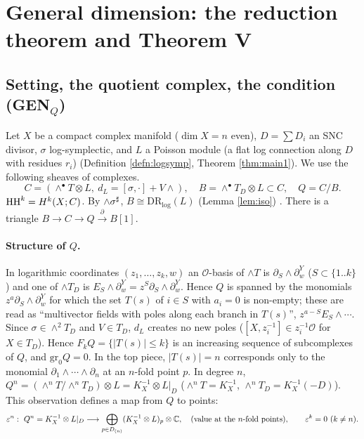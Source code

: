 \section{General dimension: the reduction theorem and Theorem V}\label{sec:reduction}
\subsection{Setting, the quotient complex, the condition (GEN$_Q$)}
Let $X$ be a compact complex manifold ($\dim X=n$ even), $D=\sum D_i$ an SNC divisor, $\sigma$ log-symplectic, and $L$ a Poisson module (a flat log connection along $D$ with residues $r_i$) (Definition \ref{defn:logsymp}, Theorem \ref{thm:main1}). We use the following sheaves of complexes.
\[C=(\wedge^\bullet T\otimes L,\ d_L=[\sigma,\cdot]+V\wedge),\quad B=\wedge^\bullet T_D\otimes L\subset C,\quad Q=C/B.\]
$\mathrm{HH}^k=H^k(X;C)$. By $\wedge\sigma^\sharp$, $B\cong\mathrm{DR}_{\log}(L)$ (Lemma \ref{lem:iso}) \tC. There is a triangle $B\to C\to Q\xrightarrow{\ \partial\ }B[1]$.

\paragraph{Structure of $Q$.} In logarithmic coordinates $(z_1,\dots,z_k,w)$ an $\mathcal O$-basis of $\wedge T$ is $\partial_S\wedge\partial_w^{Y}$ ($S\subset\{1..k\}$) and one of $\wedge T_D$ is $E_S\wedge\partial_w^Y=z^S\partial_S\wedge\partial_w^Y$. Hence $Q$ is spanned by the monomials $z^a\partial_S\wedge\partial_w^Y$ for which the set $T(s)$ of $i\in S$ with $a_i=0$ is non-empty; these are read as ``multivector fields with poles along each branch in $T(s)$'', $z^{a-S}E_S\wedge\cdots$. Since $\sigma\in\wedge^2T_D$ and $V\in T_D$, $d_L$ creates no new poles ($[X,z_i^{-1}]\in z_i^{-1}\mathcal O$ for $X\in T_D$). Hence $F_kQ=\{|T(s)|\le k\}$ is an increasing sequence of subcomplexes of $Q$, and $\mathrm{gr}_0Q=0$. In the top piece, $|T(s)|=n$ corresponds only to the monomial $\partial_1\wedge\cdots\wedge\partial_n$ at an $n$-fold point $p$. In degree $n$, $Q^n=(\wedge^nT/\wedge^nT_D)\otimes L=K_X^{-1}\otimes L|_D$ ($\wedge^nT=K_X^{-1}$, $\wedge^nT_D=K_X^{-1}(-D)$). This observation defines a map from $Q$ to points:
\[\varepsilon^n:\ Q^n=K_X^{-1}\otimes L|_D\longrightarrow\bigoplus_{p\in D_{(n)}}(K_X^{-1}\otimes L)_p\otimes\C,\quad(\text{value at the }n\text{-fold points}),\qquad \varepsilon^k=0\ (k\ne n).\]

